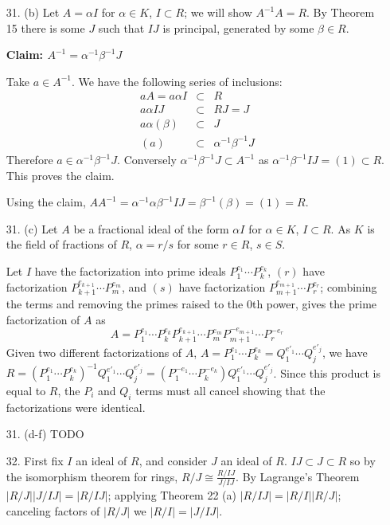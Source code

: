 \documentclass{article}
\begin{document}
\begin{enumerate}
\item[31. (b)] Let $A = \alpha I$ for $\alpha \in K$, $I \subset R$; we will show $A^{-1} A = R$.  By Theorem 15 there is some $J$ such that $IJ$ is principal, generated by some $\beta \in R$.

{\bf Claim: $A^{-1} = \alpha^{-1}\beta^{-1}J$}

Take $a \in A^{-1}$. We have the following series of inclusions:
\begin{eqnarray*}
    aA = a\alpha I &\subset& R \\
    a\alpha I J &\subset& RJ = J\\
    a \alpha (\beta) &\subset& J\\
    (a) &\subset& \alpha^{-1}\beta^{-1} J
\end{eqnarray*}
Therefore $a \in \alpha^{-1}\beta^{-1} J$.  Conversely $\alpha^{-1}\beta^{-1} J \subset A^{-1}$ as $\alpha^{-1}\beta^{-1}IJ = (1) \subset R$.  This proves the claim.

Using the claim, $A A^{-1} = \alpha^{-1}\alpha \beta^{-1} IJ = \beta^{-1} (\beta) = (1) = R$.

\item[31. (c)] Let $A$ be a fractional ideal of the form $\alpha I$ for $\alpha \in K$, $I \subset R$.  As $K$ is the field of fractions of $R$, $\alpha = r / s$ for some $r \in R$, $s \in S$.

Let $I$ have the factorization into prime ideals $P_1^{e_1} \cdots P_k^{e_k}$, $(r)$ have factorization $P_{k+1}^{e_{k+1}} \cdots P_{m}^{e_m}$, and $(s)$ have factorization $P_{m+1}^{e_{m+1}} \cdots P_{r}^{e_r}$; combining the terms and removing the primes raised to the 0th power, gives the prime factorization of $A$ as \[ A = P_1^{e_1} \cdots P_k^{e_k} P_{k+1}^{e_{k+1}} \cdots P_{m}^{e_m} P_{m+1}^{-e_{m+1}} \cdots P_{r}^{-e_r} \]
Given two different factorizations of $A$, $A = P_1^{e_1} \cdots P_k^{e_k} = Q_1^{e'_1} \cdots Q_j^{e'_j}$, we have $R = (P_1^{e_1} \cdots P_k^{e_k})^{-1} Q_1^{e'_1} \cdots Q_j^{e'_j} = (P_1^{-e_1} \cdots P_k^{-e_k}) Q_1^{e'_1} \cdots Q_j^{e'_j}$.  Since this product is equal to $R$, the $P_i$ and $Q_i$ terms must all cancel showing that the factorizations were identical.

\item[31. (d-f)] TODO

\item[32.] First fix $I$ an ideal of $R$, and consider $J$ an ideal of $R$.  $IJ \subset J \subset R$ so by the isomorphism theorem for rings, $R / J \cong \frac{R/IJ}{J/IJ}$.  By Lagrange's Theorem $|R/J||J/IJ| = |R/IJ|$; applying Theorem 22 (a) $|R/IJ| = |R/I||R/J|$; canceling factors of $|R/J|$ we $|R/I| = |J/IJ|$.


\end{enumerate}
\end{document}
